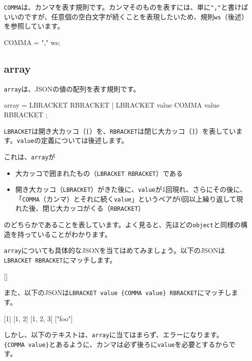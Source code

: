 \texttt{COMMA}は、カンマを表す規則です。カンマそのものを表すには、単に\texttt{","}と書けばいいのですが、任意個の空白文字が続くことを表現したいため、規則\texttt{ws}（後述）を参照しています。

\begin{codescreen}{}
COMMA = "," ws;
\end{codescreen}

\subsection{array}

\texttt{array}は、JSONの値の配列を表す規則です。

\begin{codescreen}{}
array = LBRACKET RBRACKET | LBRACKET value {COMMA value} RBRACKET ;
\end{codescreen}

\texttt{LBRACKET}は開き大カッコ（\texttt{{[}}）を、\texttt{RBRACKET}は閉じ大カッコ（\texttt{{]}}）を表しています。\texttt{value}の定義については後述します。

これは、\texttt{array}が

\begin{itemize}
\item
  大カッコで囲まれたもの（\texttt{LBRACKET\ RBRACKET}）である
\item
  開き大カッコ（\texttt{LBRACKET}）がきた後に、\texttt{value}が1回現れ、さらにその後に、「\texttt{COMMA}（カンマ）とそれに続く\texttt{value}」というペアが0回以上繰り返して現れた後、閉じ大カッコがくる（\texttt{RBRACKET}）
\end{itemize}

\noindent のどちらかであることを表しています。よく見ると、先ほどの\texttt{object}と同様の構造を持っていることがわかります。

\texttt{array}についても具体的なJSONを当てはめてみましょう。以下のJSONは\texttt{LBRACKET\ RBRACKET}にマッチします。

\begin{codescreen}{}
[]
\end{codescreen}


また、以下のJSONは\texttt{LBRACKET\ value\ \{COMMA\ value\}\ RBRACKET}にマッチします。

\begin{codescreen}{}
[1]
[1, 2]
[1, 2, 3]
["foo"]
\end{codescreen}

しかし、以下のテキストは、\texttt{array}に当てはまらず、エラーになります。\texttt{\{COMMA\ value\}}とあるように、カンマは必ず後ろに\texttt{value}を必要とするからです。

